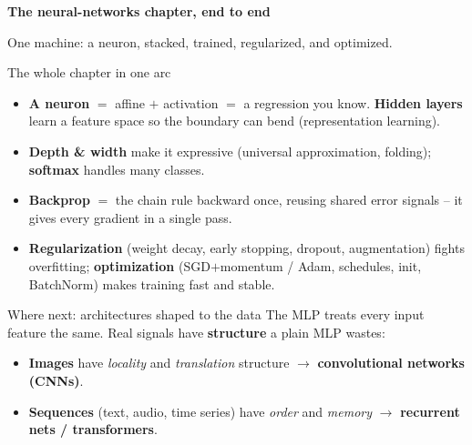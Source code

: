 \documentclass[aspectratio=43]{beamer}
\begin{document}
\begin{frame}[plain]
  \vfill
  \begin{center}
    {\Large\color{popblue}\textbf{The neural-networks chapter, end to end}}\\[0.9em]
    \begin{minipage}{0.82\textwidth}\centering\small
      One machine: a neuron, stacked, trained, regularized, and optimized.
    \end{minipage}
  \end{center}
  \vfill
\end{frame}

\begin{frame}{The whole chapter in one arc}
  \begin{itemize}\small
    \item \textbf{A neuron} $=$ affine $+$ activation $=$ a regression you know. \textbf{Hidden
      layers} learn a feature space so the boundary can bend (representation learning).
    \item \textbf{Depth \& width} make it expressive (universal approximation, folding);
      \textbf{softmax} handles many classes.
    \item \textbf{Backprop} $=$ the chain rule backward once, reusing shared error signals -- it
      gives every gradient in a single pass.
    \item \textbf{Regularization} (weight decay, early stopping, dropout, augmentation) fights
      overfitting; \textbf{optimization} (SGD$+$momentum / Adam, schedules, init, BatchNorm)
      makes training fast and stable.
  \end{itemize}
  \vfill
\end{frame}

\begin{frame}{Where next: architectures shaped to the data}
  The MLP treats every input feature the same. Real signals have \textbf{structure} a plain MLP
  wastes:
  \vfill
  \begin{itemize}\small
    \item \textbf{Images} have \emph{locality} and \emph{translation} structure $\to$
      \textbf{convolutional networks (CNNs)}.
    \item \textbf{Sequences} (text, audio, time series) have \emph{order} and \emph{memory} $\to$
      \textbf{recurrent nets / transformers}.
  \end{itemize}
  \vfill
\end{frame}
\end{document}
